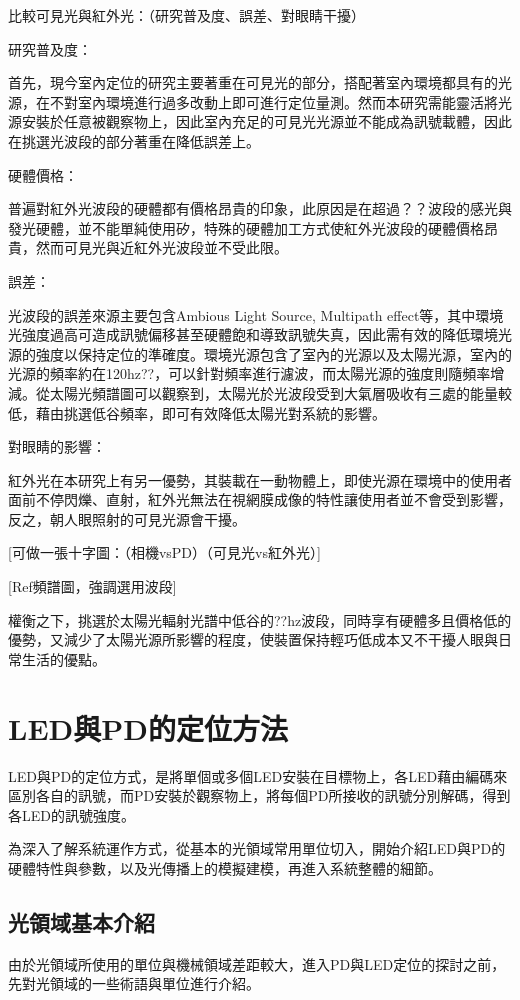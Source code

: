         比較可見光與紅外光：（研究普及度、誤差、對眼睛干擾）

        研究普及度：

        首先，現今室內定位的研究主要著重在可見光的部分，搭配著室內環境都具有的光源，在不對室內環境進行過多改動上即可進行定位量測。然而本研究需能靈活將光源安裝於任意被觀察物上，因此室內充足的可見光光源並不能成為訊號載體，因此在挑選光波段的部分著重在降低誤差上。

        硬體價格：

        普遍對紅外光波段的硬體都有價格昂貴的印象，此原因是在超過？？波段的感光與發光硬體，並不能單純使用矽，特殊的硬體加工方式使紅外光波段的硬體價格昂貴，然而可見光與近紅外光波段並不受此限。

        誤差：

        光波段的誤差來源主要包含Ambious Light Source, Multipath effect等，其中環境光強度過高可造成訊號偏移甚至硬體飽和導致訊號失真，因此需有效的降低環境光源的強度以保持定位的準確度。環境光源包含了室內的光源以及太陽光源，室內的光源的頻率約在120hz??，可以針對頻率進行濾波，而太陽光源的強度則隨頻率增減。從太陽光頻譜圖可以觀察到，太陽光於光波段受到大氣層吸收有三處的能量較低，藉由挑選低谷頻率，即可有效降低太陽光對系統的影響。

        對眼睛的影響：

        紅外光在本研究上有另一優勢，其裝載在一動物體上，即使光源在環境中的使用者面前不停閃爍、直射，紅外光無法在視網膜成像的特性讓使用者並不會受到影響，反之，朝人眼照射的可見光源會干擾。

        [可做一張十字圖：（相機vsPD）（可見光vs紅外光）]

        [Ref頻譜圖，強調選用波段]

        權衡之下，挑選於太陽光輻射光譜中低谷的??hz波段，同時享有硬體多且價格低的優勢，又減少了太陽光源所影響的程度，使裝置保持輕巧低成本又不干擾人眼與日常生活的優點。

\section{LED與PD的定位方法}

    LED與PD的定位方式，是將單個或多個LED安裝在目標物上，各LED藉由編碼來區別各自的訊號，而PD安裝於觀察物上，將每個PD所接收的訊號分別解碼，得到各LED的訊號強度。

    為深入了解系統運作方式，從基本的光領域常用單位切入，開始介紹LED與PD的硬體特性與參數，以及光傳播上的模擬建模，再進入系統整體的細節。

    \subsection{光領域基本介紹}
        由於光領域所使用的單位與機械領域差距較大，進入PD與LED定位的探討之前，先對光領域的一些術語與單位進行介紹。

